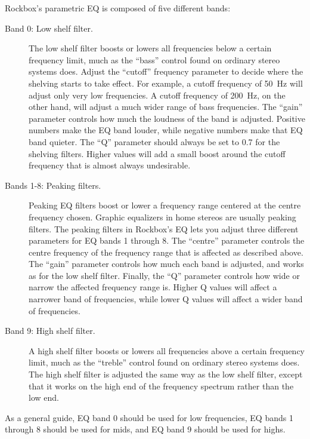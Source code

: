 {  

  Rockbox's parametric EQ is composed of five different bands:
  \begin{description}
  \item[Band 0: Low shelf filter.]
        The low shelf filter boosts or lowers all frequencies below a certain
        frequency limit, much as the ``bass'' control found on ordinary
        stereo systems does.
        Adjust the ``cutoff'' frequency parameter to decide where the shelving
        starts to take effect. For example, a cutoff frequency of 50~Hz will
        adjust only very low frequencies. A cutoff frequency of 200~Hz, on the
        other hand, will adjust a much wider range of bass frequencies.
        The ``gain'' parameter controls how much the loudness of the band is
        adjusted. Positive numbers make the EQ band louder, while negative
        numbers make that EQ band quieter.
        The ``Q'' parameter should always be set to 0.7 for the shelving
        filters. Higher values will add a small boost around the cutoff
        frequency that is almost always undesirable.
  \item[Bands 1-8: Peaking filters.]
        Peaking EQ filters boost or lower a frequency range centered at the
        centre frequency chosen.
        Graphic equalizers in home stereos are usually peaking
        filters. The peaking filters in Rockbox's EQ lets you adjust three
        different parameters for EQ bands 1 through 8. The ``centre'' parameter
        controls the centre frequency of the frequency range that is affected
        as described above.
        The ``gain'' parameter controls how much each band is adjusted, and
        works as for the low shelf filter.
        Finally, the ``Q'' parameter controls how wide or narrow the affected
        frequency range is. Higher Q values will affect a narrower band of
        frequencies, while lower Q values will affect a wider band of
        frequencies.
  \item[Band 9: High shelf filter.]
        A high shelf filter boosts or lowers all frequencies above a certain
        frequency limit, much as the ``treble'' control found on ordinary
        stereo systems does.
        The high shelf filter is adjusted the same way as the low shelf filter,
        except that it works on the high end of the frequency spectrum rather
        than the low end.
  \end{description}
  As a general guide, EQ band 0 should be used for low frequencies, EQ bands 1
  through 8 should be used for mids, and EQ band 9 should be used for highs.

}
